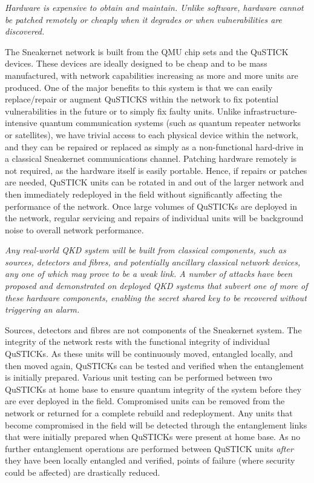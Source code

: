 \documentclass[twocolumn, aps, rmp, amsmath, amssymb, nofootinbib, superscriptaddress, longbibliography, floatfix, table-of-contents, eqsecnum]{revtex4-2}
\begin{document}
{\em Hardware is expensive to obtain and maintain. Unlike software, hardware cannot be patched remotely or cheaply when it degrades or when vulnerabilities are discovered.}

The Sneakernet network is built from the QMU chip sets and the QuSTICK devices. These devices are ideally designed to be cheap and to be mass manufactured, with network capabilities increasing as more and more units are produced. One of the major benefits to this system is that we can easily replace/repair or augment QuSTICKS within the network to fix potential vulnerabilities in the future or to simply fix faulty units. Unlike infrastructure-intensive quantum communication systems (such as quantum repeater networks or satellites), we have trivial access to each physical device within the network, and they can be repaired or replaced as simply as a non-functional hard-drive in a classical Sneakernet communications channel. Patching hardware remotely is not required, as the hardware itself is easily portable. Hence, if repairs or patches are needed, QuSTICK units can be rotated in and out of the larger network and then immediately redeployed in the field without significantly affecting the performance of the network. Once large volumes of QuSTICKs are deployed in the network, regular servicing and repairs of individual units will be background noise to overall network performance. 

{\em Any real-world QKD system will be built from classical components, such as sources, detectors and fibres, and potentially ancillary classical network devices, any one of which may prove to be a weak link. A number of attacks have been proposed and demonstrated on deployed QKD systems that subvert one of more of these hardware components, enabling the secret shared key to be recovered without triggering an alarm.}

Sources, detectors and fibres are not components of the Sneakernet system. The integrity of the network rests with the functional integrity of individual QuSTICKs. As these units will be continuously moved, entangled locally, and then moved again, QuSTICKs can be tested and verified when the entanglement is initially prepared. Various unit testing can be performed between two QuSTICKs at home base to ensure quantum integrity of the system before they are ever deployed in the field. Compromised units can be removed from the network or returned for a complete rebuild and redeployment. Any units that become compromised in the field will be detected through the entanglement links that were initially prepared when QuSTICKs were present at home base. As no further entanglement operations are performed between QuSTICK units \textit{after} they have been locally entangled and verified, points of failure (where security could be affected) are drastically reduced. 
\end{document}
